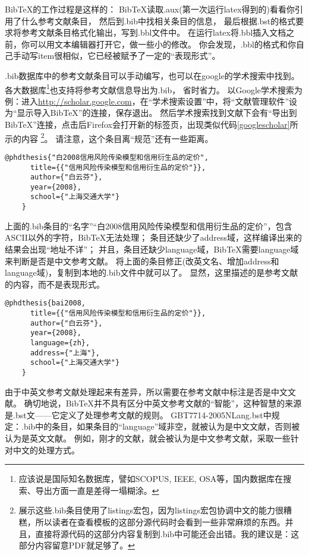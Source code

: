 BibTeX的工作过程是这样的：
BibTeX读取.aux(第一次运行latex得到的)看看你引用了什么参考文献条目，
然后到.bib中找相关条目的信息，
最后根据.bst的格式要求将参考文献条目格式化输出，写到.bbl文件中。
在运行latex将.bbl插入文档之前，你可以用文本编辑器打开它，做一些小的修改。
你会发现，.bbl的格式和你自己手动写item很相似，它已经被赋予了一定的``表现形式''。

.bib数据库中的参考文献条目可以手动编写，也可以在google的学术搜索中找到。
各大数据库\footnote{应该说是国际知名数据库，譬如SCOPUS, IEEE, OSA等，国内数据库在搜索、导出方面一直是差得一塌糊涂。}也支持将参考文献信息导出为.bib，
省时省力。
以Google学术搜索为例：进入\url{http://scholar.google.com}，在``学术搜索设置''中，将``文献管理软件''设为``显示导入BibTeX''的连接，保存退出。
然后学术搜索找到文献下会有``导出到BibTeX''连接，点击后Firefox会打开新的标签页，出现类似代码\ref{googlescholar}所示的内容
\footnote{展示这些.bib条目使用了listings宏包，因为listings宏包协调中文的能力很糟糕，所以读者在查看模板的这部分源代码时会看到一些非常麻烦的东西。并且，直接将源代码的这部分内容复制到.bib中可能还会出错。我的建议是：这部分内容留意PDF就足够了。}。
请注意，这个条目离``规范''还有一些距离。

  \begin{lstlisting}[caption={从Google Scholar找到的，但并不规范的.bib条目}, label=googlescholar, float, escapeinside="", numbers=none]
    @phdthesis{"白2008信用风险传染模型和信用衍生品的定价",
      title={{"信用风险传染模型和信用衍生品的定价"}},
      author={"白云芬"},
      year={2008},
      school={"上海交通大学"}
    } 
  \end{lstlisting}

  上面的.bib条目的``名字''\cndash{}``白2008信用风险传染模型和信用衍生品的定价''，包含ASCII以外的字符，BibTeX无法处理；
  条目还缺少了address域，这样编译出来的结果会出现``地址不详''；
  并且，条目还缺少language域，BibTeX需要language域来判断是否是中文参考文献。
  将上面的条目修正(改英文名、增加address和language域)，复制到本地的.bib文件中就可以了。
  显然，这里描述的是参考文献的内容，而不是表现形式。

  \begin{lstlisting}[caption={一个符合规范的.bib条目}, label=itemok, float, escapeinside="", numbers=none]
    @phdthesis{bai2008,
      title={{"信用风险传染模型和信用衍生品的定价"}},
      author={"白云芬"},
      year={2008},
      language={zh},
      address={"上海"},
      school={"上海交通大学"}
    } 
  \end{lstlisting}

由于中英文参考文献处理起来有差异，所以需要在参考文献中标注是否是中文文献。
确切地说，BibTeX并不具有区分中英文参考文献的``智能''，这种智慧的来源是.bst文——它定义了处理参考文献的规则。
GBT7714-2005NLang.bst中规定：.bib中的条目，如果条目的``language''域非空，就被认为是中文文献，否则被认为是英文文献。
例如，刚才的文献，就会被认为是中文参考文献，采取一些针对中文的处理方式。

